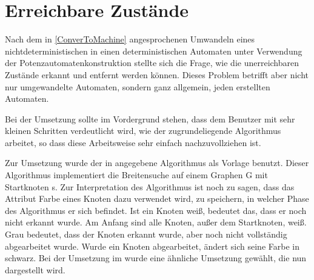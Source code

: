 \section{Erreichbare Zustände}\label{ReachableStates}

Nach dem in \ref{ConverToMachine} angesprochenen Umwandeln eines
nichtdeterministischen in einen deterministischen Automaten unter Verwendung der
Potenzautomatenkonstruktion stellte sich die Frage, wie die unerreichbaren
Zustände erkannt und entfernt werden können. Dieses Problem betrifft aber nicht
nur umgewandelte Automaten, sondern ganz allgemein, jeden erstellten
Automaten.\vspace{10pt}

Bei der Umsetzung sollte im Vordergrund stehen, dass dem Benutzer mit sehr
kleinen Schritten verdeutlicht wird, wie der zugrundeliegende Algorithmus
arbeitet, so dass diese Arbeitsweise sehr einfach nachzuvollziehen
ist.\vspace{10pt}

Zur Umsetzung wurde der in \cite[S. 536]{Algorithmen} angegebene Algorithmus
als Vorlage benutzt. Dieser Algorithmus implementiert die Breitensuche auf
einem Graphen G mit Startknoten s. Zur Interpretation des Algorithmus ist noch
zu sagen, dass das Attribut Farbe eines Knoten dazu verwendet wird, zu
speichern, in welcher Phase des Algorithmus er sich befindet. Ist ein Knoten
weiß, bedeutet das, dass er noch nicht erkannt wurde. Am Anfang sind alle
Knoten, außer dem Startknoten, weiß. Grau bedeutet, dass der Knoten erkannt
wurde, aber noch nicht vollständig abgearbeitet wurde. Wurde ein Knoten
abgearbeitet, ändert sich seine Farbe in schwarz. Bei der Umsetzung im \gtitool
wurde eine ähnliche Umsetzung gewählt, die nun dargestellt wird.\vspace{10pt}

